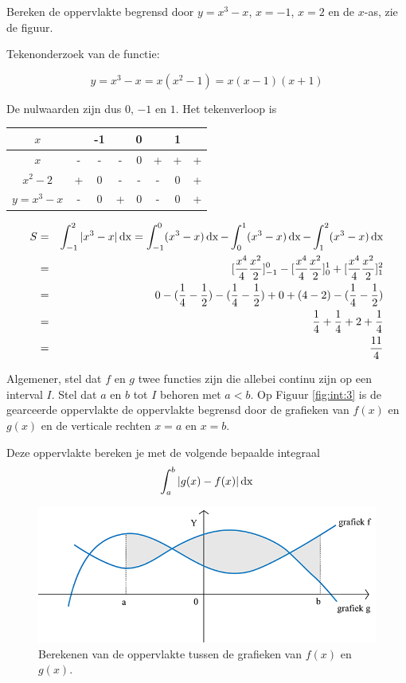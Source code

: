 \begin{voorbeeld}
Bereken de oppervlakte begrensd door $y=x^3-x$, $x=-1$, $x=2$ en de $x$-as, zie de figuur.


Tekenonderzoek van de functie:

\begin{equation*}
y=x^3-x=x(x^2-1)=x(x-1)(x+1)
\end{equation*}

De nulwaarden zijn dus $0$, $-1$ en $1$. Het tekenverloop is
\begin{center}
	\begin{tabular}{c|ccccccc}
	$x$ & & -1 & & 0 & & 1 & \\
	\hline
	$x$ & - & - & -& 0 & + & + & + \\
	$x^2-2$ & + & 0 & -& - & - & 0 & + \\
	\hline 
	$y=x^3-x$ & - & 0 & +& 0 & - & 0 & + 
	\end{tabular}
\end{center}

\begin{eqnarray*}
S &=& \int_{-1}^{2}|x^3-x|\operatorname{dx} = \int_{-1}^{0}(x^3-x)\operatorname{dx} - \int_{0}^{1}(x^3-x)\operatorname{dx} - \int_{1}^{2}(x^3-x)\operatorname{dx} \\
&=& [\frac{x^4}{4}\frac{x^2}{2}]_{-1}^{0} - [\frac{x^4}{4}\frac{x^2}{2}]_{0}^{1} + [\frac{x^4}{4}\frac{x^2}{2}]_{1}^{2} \\
&=& 0 - (\frac{1}{4}-\frac{1}{2}) - (\frac{1}{4}-\frac{1}{2}) + 0 + (4-2) - (\frac{1}{4}-\frac{1}{2}) \\
&=& \frac{1}{4} + \frac{1}{4} + 2 + \frac{1}{4} \\
&=& \frac{11}{4}
\end{eqnarray*}

\end{voorbeeld}

Algemener, stel dat $f$ en $g$ twee functies zijn die allebei continu zijn op een interval $I$. Stel dat $a$ en $b$ tot $I$ behoren met $a<b$. Op Figuur \ref{fig:int:3} is de gearceerde oppervlakte de oppervlakte begrensd door de grafieken van $f(x)$ en $g(x)$ en de verticale rechten $x=a$ en $x=b$.

Deze oppervlakte bereken je met de volgende bepaalde integraal
\begin{equation*}
\int_{a}^{b} | g(x)-f(x)| \operatorname{dx}
\end{equation*}

\begin{figure}
	\centering
	\includegraphics[width=0.7\linewidth]{6_afgeleiden_integralen/inputs/integraal3.png}
	\caption{Berekenen van de oppervlakte tussen de grafieken van $f(x)$ en $g(x)$.}
	\label{fig:integraal3}
\end{figure}

